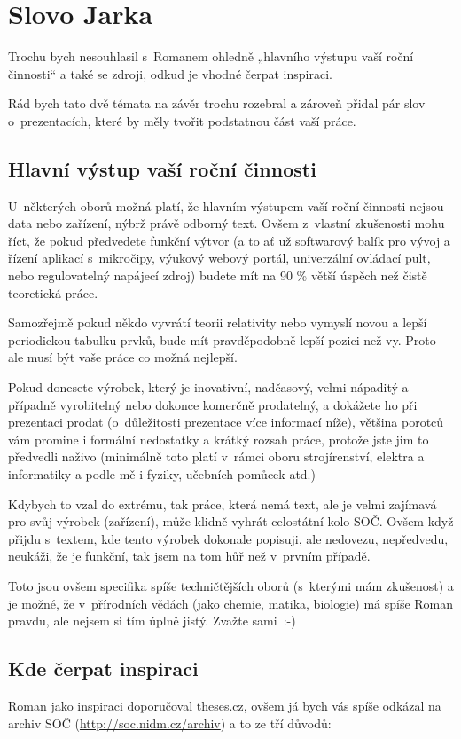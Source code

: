 \chapter{Slovo Jarka}
Trochu bych nesouhlasil s~Romanem ohledně „hlavního výstupu vaší roční činnosti“ a také se zdroji, odkud je vhodné čerpat inspiraci.

Rád bych tato dvě témata na závěr trochu rozebral a zároveň přidal pár slov o~prezentacích, které by měly tvořit podstatnou část vaší práce.

\section{Hlavní výstup vaší roční činnosti}
U~některých oborů možná platí, že hlavním výstupem vaší roční činnosti nejsou data nebo zařízení, nýbrž právě odborný text.
Ovšem z~vlastní zkušenosti mohu říct, že pokud předvedete funkční výtvor (a to ať už softwarový balík pro vývoj a řízení aplikací s~mikročipy, výukový webový portál, univerzální ovládací pult, nebo regulovatelný napájecí zdroj) budete mít na 90 \% větší úspěch než čistě teoretická práce.

Samozřejmě pokud někdo vyvrátí teorii relativity nebo vymyslí novou a lepší periodickou tabulku prvků, bude mít pravděpodobně lepší pozici než vy.
Proto ale musí být vaše práce co možná nejlepší.

Pokud donesete výrobek, který je inovativní, nadčasový, velmi nápaditý a případně vyrobitelný nebo dokonce komerčně prodatelný, a dokážete ho při prezentaci prodat (o~důležitosti prezentace více informací níže), většina porotců vám promine i formální nedostatky a krátký rozsah práce, protože jste jim to předvedli naživo (minimálně toto platí v~rámci oboru strojírenství, elektra a informatiky a podle mě i fyziky, učebních pomůcek atd.)

Kdybych to vzal do extrému, tak práce, která nemá text, ale je velmi zajímavá pro svůj výrobek (zařízení), může klidně vyhrát celostátní kolo SOČ.
Ovšem když přijdu s~textem, kde tento výrobek dokonale popisuji, ale nedovezu, nepředvedu, neukáži, že je funkční, tak jsem na tom hůř než v~prvním případě.

Toto jsou ovšem specifika spíše techničtějších oborů (s~kterými mám zkušenost) a je možné, že v~přírodních vědách (jako chemie, matika, biologie) má spíše Roman pravdu, ale nejsem si tím úplně jistý.
Zvažte sami~:-)

\section{Kde čerpat inspiraci}
Roman jako inspiraci doporučoval theses.cz, ovšem já bych vás spíše odkázal na archiv SOČ (\url{http://soc.nidm.cz/archiv}) a to ze tří důvodů:

